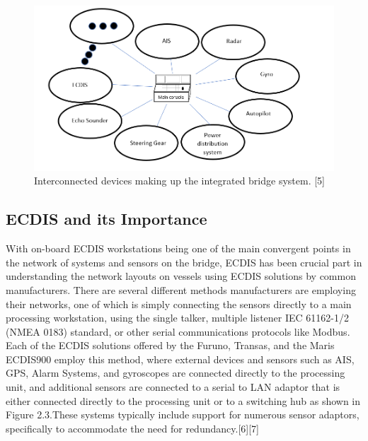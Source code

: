 \documentclass{report}
\begin{document}
\begin{figure}[h]
    \centering
    \includegraphics[width=12cm]{Images and Figures/Navigation Bridge.PNG}
    \caption{Interconnected devices making up the integrated bridge system. [5]}
    \label{fig:Navigation Bridge}
\end{figure}

\subsection{ECDIS and its Importance}

With on-board ECDIS workstations being one of the main convergent points in the network of systems and sensors on the bridge, ECDIS has been crucial part in understanding the network layouts on vessels using ECDIS solutions by common manufacturers. There are several different methods manufacturers are employing their networks, one of which is simply connecting the sensors directly to a main processing workstation, using the single talker, multiple listener IEC 61162-1/2 (NMEA 0183) standard, or other serial communications protocols like Modbus. Each of the ECDIS solutions offered by the Furuno, Transas, and the Maris ECDIS900 employ this method, where external devices and sensors such as AIS, GPS, Alarm Systems, and gyroscopes are connected directly to the processing unit, and additional sensors are connected to a serial to LAN adaptor that is either connected directly to the processing unit or to a switching hub as shown in Figure 2.3.These systems typically include support for numerous sensor adaptors, specifically to accommodate the need for redundancy.[6][7] 
\end{document}
